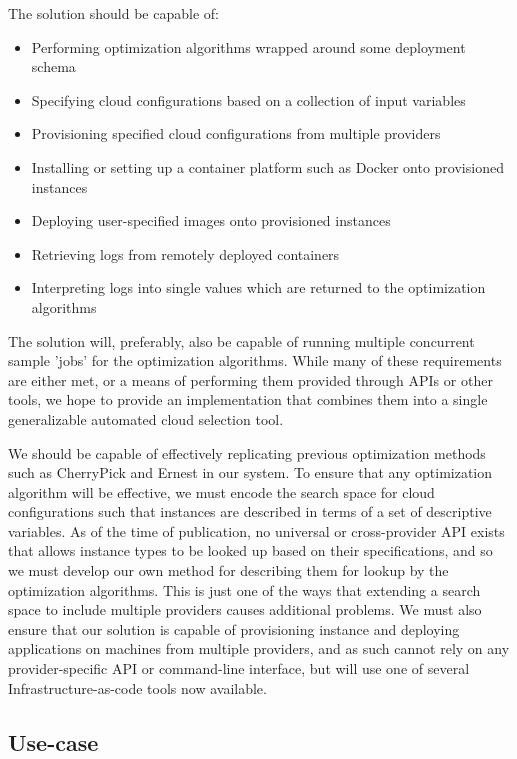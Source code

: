 \documentclass{article}
\begin{document}
The solution should be capable of:
\begin{itemize}
\item Performing optimization algorithms wrapped around some deployment schema
\item Specifying cloud configurations based on a collection of input variables
\item Provisioning specified cloud configurations from multiple providers
\item Installing or setting up a container platform such as Docker onto provisioned instances
\item Deploying user-specified images onto provisioned instances
\item Retrieving logs from remotely deployed containers
\item Interpreting logs into single values which are returned to the optimization algorithms
\end{itemize}

The solution will, preferably, also be capable of running multiple concurrent sample 'jobs' for the optimization algorithms.
While many of these requirements are either met, or a means of performing them provided through APIs or other tools, we hope to provide an implementation that combines them into a single generalizable automated cloud selection tool. 

We should be capable of effectively replicating previous optimization methods such as CherryPick and Ernest in our system. To ensure that any optimization algorithm will be effective, we must encode the search space for cloud configurations such that instances are described in terms of a set of descriptive variables. As of the time of publication, no universal or cross-provider API exists that allows instance types to be looked up based on their specifications, and so we must develop our own method for describing them for lookup by the optimization algorithms. This is just one of the ways that extending a search space to include multiple providers causes additional problems. We must also ensure that our solution is capable of provisioning instance and deploying applications on machines from multiple providers, and as such cannot rely on any provider-specific API or command-line interface, but will use one of several Infrastructure-as-code tools now available.

\subsection{Use-case}
\end{document}
